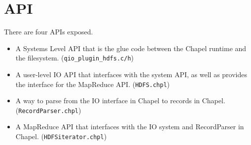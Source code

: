 
\section{API}\label{s:API}

There are four APIs exposed. 
\begin{itemize}
\item A Systems Level API that is the glue code between the Chapel runtime
and the filesystem. ({\tt qio\_plugin\_hdfs.c/h})
\item A user-level IO API that interfaces with the system API, as well as
provides the interface for the MapReduce API.
({\tt HDFS.chpl})
\item A way to parse from the IO interface in Chapel to records in Chapel.
({\tt RecordParser.chpl})
\item A MapReduce API that interfaces with the IO system and
RecordParser in Chapel. ({\tt HDFSiterator.chpl})
\end{itemize}
%
